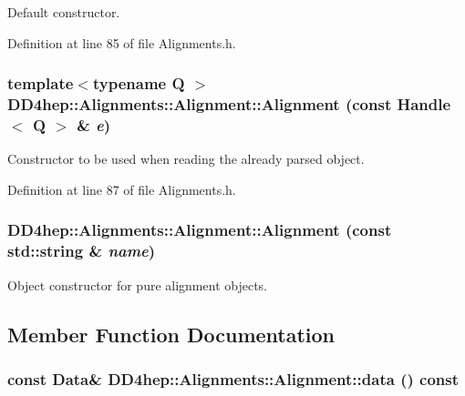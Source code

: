 Default constructor. 

Definition at line 85 of file Alignments.h.\hypertarget{class_d_d4hep_1_1_alignments_1_1_alignment_aea881ba23fa6887672dc5ff0b2bb7025}{
\subsubsection[{Alignment}]{\setlength{\rightskip}{0pt plus 5cm}template$<$typename Q $>$ DD4hep::Alignments::Alignment::Alignment (const {\bf Handle}$<$ Q $>$ \& {\em e})}}
\label{class_d_d4hep_1_1_alignments_1_1_alignment_aea881ba23fa6887672dc5ff0b2bb7025}


Constructor to be used when reading the already parsed object. 

Definition at line 87 of file Alignments.h.\hypertarget{class_d_d4hep_1_1_alignments_1_1_alignment_afe496862cf06bb5ba006b6c20362e2b1}{
\subsubsection[{Alignment}]{\setlength{\rightskip}{0pt plus 5cm}DD4hep::Alignments::Alignment::Alignment (const std::string \& {\em name})}}
\label{class_d_d4hep_1_1_alignments_1_1_alignment_afe496862cf06bb5ba006b6c20362e2b1}


Object constructor for pure alignment objects. 

\subsection{Member Function Documentation}
\hypertarget{class_d_d4hep_1_1_alignments_1_1_alignment_a4e3a6f62b476f5fac4a097ae55be8f62}{
\subsubsection[{data}]{\setlength{\rightskip}{0pt plus 5cm}const {\bf Data}\& DD4hep::Alignments::Alignment::data () const}}
\label{class_d_d4hep_1_1_alignments_1_1_alignment_a4e3a6f62b476f5fac4a097ae55be8f62}



